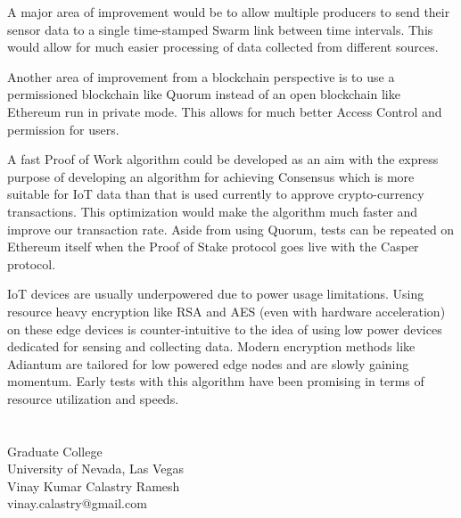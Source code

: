 \documentclass[11pt,openright]{report}
\begin{document}
A major area of improvement would be to allow multiple producers to send their sensor data to a single time-stamped Swarm link between time intervals. This would allow for much easier processing of data collected from different sources.

Another area of improvement from a blockchain perspective is to use a permissioned blockchain like Quorum\cite{quorum} instead of an open blockchain like Ethereum run in private mode. This allows for much better Access Control and permission for users.

A fast Proof of Work algorithm could be developed as an aim with the express purpose of developing an algorithm for achieving Consensus which is more suitable for IoT data than that is used currently to approve crypto-currency transactions. This optimization would make the algorithm much faster and improve our transaction rate. Aside from using Quorum, tests can be repeated on Ethereum itself when the Proof of Stake protocol goes live with the Casper protocol.

IoT devices are usually underpowered due to power usage limitations. Using resource heavy encryption like RSA and AES (even with hardware acceleration) on these edge devices is counter-intuitive to the idea of using low power devices dedicated for sensing and collecting data. Modern encryption methods like Adiantum \cite{DBLP:journals/tosc/CrowleyB18} are tailored for low powered edge nodes and are slowly gaining momentum. Early tests with this algorithm have been promising in terms of resource utilization and speeds.




\vita
\chapter{} %
\linespread{1.3}
\begin{center}
Graduate College\\
University of Nevada, Las Vegas\\[1cm]
Vinay Kumar Calastry Ramesh\\
vinay.calastry@gmail.com\\[1cm]
\end{center}
\end{document}
